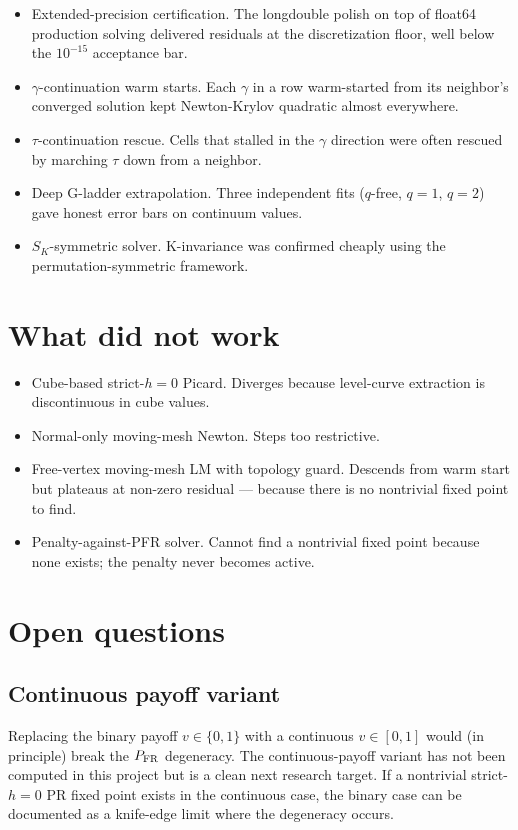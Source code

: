 \documentclass[11pt]{article}
\newcommand{\1}{\mathbf{1}}
\newcommand{\PFR}{P_{\rm FR}}
\begin{document}
\begin{itemize}
\item Extended-precision certification.  The longdouble polish on top
of float64 production solving delivered residuals at the
discretization floor, well below the $10^{-15}$ acceptance bar.
\item $\gamma$-continuation warm starts.  Each $\gamma$ in a row
warm-started from its neighbor's converged solution kept Newton-Krylov
quadratic almost everywhere.
\item $\tau$-continuation rescue.  Cells that stalled in the $\gamma$
direction were often rescued by marching $\tau$ down from a neighbor.
\item Deep G-ladder extrapolation.  Three independent fits ($q$-free,
$q{=}1$, $q{=}2$) gave honest error bars on continuum values.
\item $S_K$-symmetric solver.  K-invariance was confirmed cheaply
using the permutation-symmetric framework.
\end{itemize}

\section{What did not work}

\begin{itemize}
\item Cube-based strict-$h=0$ Picard.  Diverges because level-curve
extraction is discontinuous in cube values.
\item Normal-only moving-mesh Newton.  Steps too restrictive.
\item Free-vertex moving-mesh LM with topology guard.  Descends from
warm start but plateaus at non-zero residual --- because there is no
nontrivial fixed point to find.
\item Penalty-against-PFR solver.  Cannot find a nontrivial fixed
point because none exists; the penalty never becomes active.
\end{itemize}

\section{Open questions}

\subsection{Continuous payoff variant}

Replacing the binary payoff $v \in \{0, 1\}$ with a continuous
$v \in [0, 1]$ would (in principle) break the $\PFR$ degeneracy.
The continuous-payoff variant has not been computed in this project
but is a clean next research target.  If a nontrivial strict-$h=0$ PR
fixed point exists in the continuous case, the binary case can be
documented as a knife-edge limit where the degeneracy occurs.
\end{document}
